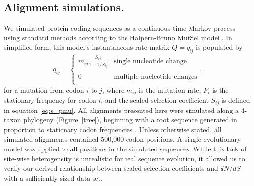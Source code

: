 \documentclass[11pt]{article}
\begin{document}
\subsection*{Alignment simulations.}
We simulated protein-coding sequences as a continuous-time Markov process using standard methods \cite{Yang2006} according to the Halpern-Bruno MutSel model \cite{HalpernBruno1998}. In simplified form, this model's instantaneous rate matrix $Q = q_{ij}$ is populated by
\begin{equation}\label{eq:HBmatrix}
q_{ij} = \left\{ 
\begin{array}{rl}
m_{ij} \frac{S_{ij}}{1-1/S_{ij}} &\mbox{single nucleotide change} \\\\
0                                  &\mbox{multiple nucleotide changes} \\             
\end{array} \right.,
\end{equation} for a mutation from codon $i$ to $j$, where $m_{ij}$ is the mutation rate, $P_i$ is the stationary frequency for codon $i$, and the scaled selection coefficient $S_{ij}$ is defined in equation \eqref{eq:s_pmu}. All alignments presented here were simulated along a 4-taxon phylogeny (Figure~\ref{tree}), beginning with a root sequence generated in proportion to  stationary codon frequencies \cite{Yang2006}. Unless otherwise stated, all simulated alignments contained 500,000 codon positions. A single evolutionary model was applied to all positions in the simulated sequences. While this lack of site-wise heterogeneity is unrealistic for real sequence evolution, it allowed us to verify our derived relationship between scaled selection coefficients and $dN/dS$ with a sufficiently sized data set.

	
\end{document}
